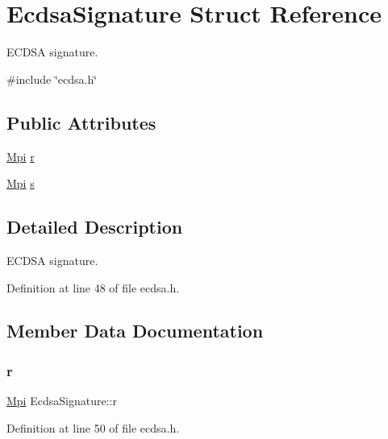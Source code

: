 \hypertarget{structEcdsaSignature}{}\section{Ecdsa\+Signature Struct Reference}
\label{structEcdsaSignature}


E\+C\+D\+SA signature.  




{\ttfamily \#include \char`\"{}ecdsa.\+h\char`\"{}}

\subsection*{Public Attributes}
\begin{DoxyCompactItemize}
\item 
\hyperlink{structMpi}{Mpi} \hyperlink{structEcdsaSignature_a4e23fcd13582b13713fd2b79355ec586}{r}
\item 
\hyperlink{structMpi}{Mpi} \hyperlink{structEcdsaSignature_a5ad53c056e439704d86c50e4b8a328b6}{s}
\end{DoxyCompactItemize}


\subsection{Detailed Description}
E\+C\+D\+SA signature. 

Definition at line 48 of file ecdsa.\+h.



\subsection{Member Data Documentation}
\mbox{\label{structEcdsaSignature_a4e23fcd13582b13713fd2b79355ec586}} 
\subsubsection{\texorpdfstring{r}{r}}
{\footnotesize\ttfamily \hyperlink{structMpi}{Mpi} Ecdsa\+Signature\+::r}



Definition at line 50 of file ecdsa.\+h.

\mbox{\label{structEcdsaSignature_a5ad53c056e439704d86c50e4b8a328b6}} 
